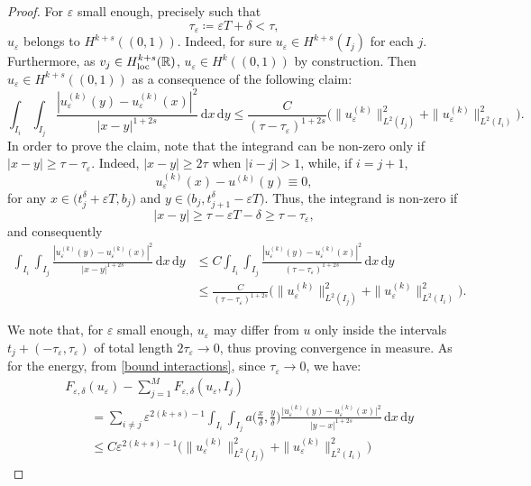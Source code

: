 \documentclass{article}
\theoremstyle{definition}
\newcommand{\de}{\mathrm{d}}
\newcommand{\R}{\mathbb{R}}
\newcommand{\e}{\varepsilon}
\newcommand{\del}{\delta}
\def\e{\varepsilon}
\begin{document}
\begin{proof}
    For $\e$ small enough, precisely such that 
    \begin{equation*}
        \tau_\e\coloneqq \e T+\delta<\tau,
    \end{equation*} $u_\e$ belongs to $H^{k+s}((0,1))$.
    Indeed, for sure $u_\e\in H^{k+s}(I_j)$ for each $j$. Furthermore, as $v_j\in H^{k+s}_{\rm loc}(\R)$, $u_\e\in H^k((0,1))$ by construction.  %
    Then $u_\e\in H^{k+s}((0,1))$ as a consequence of the following claim:
    \begin{equation}
    \label{bound interactions}
        \int_{I_i}\int_{I_j} \frac{|u^{(k)}_\e(y)-u^{(k)}_\e(x)|^2}{|x-y|^{1+2s}} \,\de x\,\de y \leq \frac{C}{(\tau-\tau_\e)^{1+2s}}\big(\|u_\e^{(k)}\|^2_{L^2(I_j)} +  \|u_\e^{(k)}\|^2_{L^2(I_i)}\big).
    \end{equation}
    In order to prove the claim, note that the integrand can be non-zero only if
$|x-y|\geq \tau-\tau_\e$. Indeed, $|x-y|\geq 2\tau$  when  $|i-j|>1$, while, if $i=j+1$, 
\[u^{(k)}_\e(x)-u^{(k)}(y) \equiv 0,\]
for any $x\in\big(t_j^\delta+\e T, b_j)$ and $y\in(b_j,t_{j+1}^\delta-\e T\big)$. Thus, the integrand is non-zero if
\[|x-y| \geq \tau-\e T-\delta\geq \tau-\tau_\e,\]
and consequently 
\begin{align*}
   \int_{I_i}\int_{I_j} \frac{|u^{(k)}_\e(y)-u^{(k)}_\e(x)|^2}{|x-y|^{1+2s}} \,\de x\,\de y&\leq C\int_{I_i}\int_{I_j} \frac{|u^{(k)}_\e(y)-u^{(k)}_\e(x)|^2}{(\tau-\tau_\e)^{1+2s}} \,\de x\,\de y \\
    &\leq \frac{C}{(\tau-\tau_\e)^{1+2s}}\big(\|u_\e^{(k)}\|^2_{L^2(I_j)} +  \|u_\e^{(k)}\|^2_{L^2(I_i)}\big).
\end{align*}


    We note that, for $\e$ small enough, $u_\e$ may differ from $u$ only inside the intervals $t_j+(-\tau_\e,\tau_\e)$
    of total length $2\tau_\e\rightarrow 0$, thus proving convergence in measure. As for the energy, from \eqref{bound interactions}, since $\tau_\e\to 0$, we have:
\begin{equation}\label{eq:energy_difference_recovery}
    \begin{split}
          & F_{\e,\del}(u_\e) - \sum_{j=1}^M F_{\e,\del}(u_\e, I_j) \\
           &\qquad =\sum_{i\neq j} \e^{2(k+s)-1} \int_{I_i}\int_{I_j}a\Big(\frac{x}{\delta},\frac{y}{\delta}\Big)\frac{\big|{u^{(k)}_\e(y)-u^{(k)}_\e(x)}\big|^2}{|y-x|^{1+2s}} \,\de x\,\de y\\
           &\qquad\leq C \e^{2(k+s)-1}\big(\|u_\e^{(k)}\|^2_{L^2(I_j)} +  \|u_\e^{(k)}\|^2_{L^2(I_i)}\big)
    \end{split}
\end{equation}


\end{proof}
\end{document}
